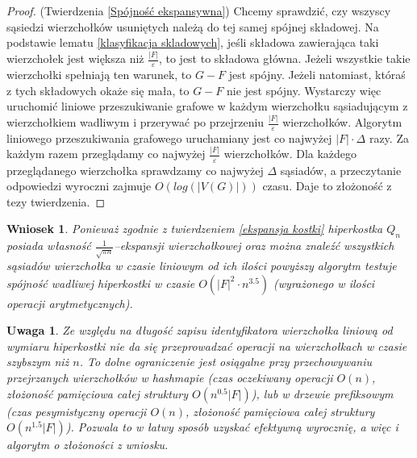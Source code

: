\documentclass{pracamgr}
\newtheorem{remark}[theorem]{Uwaga}
\newtheorem{corollary}[theorem]{Wniosek}
\begin{document}
   \begin{proof}
    (Twierdzenia \ref{Spójność ekspansywna})\newline
    Chcemy sprawdzić, czy wszyscy sąsiedzi wierzchołków usuniętych należą do tej samej spójnej składowej. Na podstawie lematu \ref{klasyfikacja skladowych},
    jeśli składowa zawierająca taki wierzchołek jest większa niż $\frac{|F|}{\varepsilon}$, to jest to składowa główna.
    Jeżeli wszystkie takie wierzchołki spełniają ten warunek, to $G-F$ jest spójny.
    Jeżeli natomiast, któraś z tych składowych okaże się mała, to $G-F$ nie jest spójny.\newline
    Wystarczy więc uruchomić liniowe przeszukiwanie grafowe w każdym wierzchołku sąsiadującym z wierzchołkiem wadliwym i przerywać po przejrzeniu
    $\frac{|F|}{\varepsilon}$ wierzchołków.\newline
    Algorytm liniowego przeszukiwania grafowego uruchamiany jest co najwyżej $|F|\cdot\Delta$ razy.
    Za każdym razem przeglądamy co najwyżej $\frac{|F|}{\varepsilon}$ wierzchołków.
    Dla każdego przeglądanego wierzchołka sprawdzamy co najwyżej $\Delta$ sąsiadów, a przeczytanie odpowiedzi wyroczni zajmuje $O(log(|V(G)|))$ czasu.
    Daje to złożoność z tezy twierdzenia.
   \end{proof}
   \begin{corollary}\label{ekspansywna spojnosc dla kostki}
    Ponieważ zgodnie z twierdzeniem \ref{ekspansja kostki} hiperkostka $Q_n$ posiada własność\newline
    $\frac{1}{\sqrt{\pi n}}$--ekspansji wierzchołkowej
    oraz można znaleźć wszystkich sąsiadów wierzchołka w czasie liniowym od ich ilości powyższy algorytm testuje spójność wadliwej hiperkostki w czasie
    ${O(|F|^2\cdot n^{3.5})}$ (wyrażonego w ilości operacji arytmetycznych).
   \end{corollary}
   \begin{remark}\label{prawdziwa zlozoność ekspansywnej}
    Ze względu na długość zapisu identyfikatora wierzchołka liniową od wymiaru hiperkostki nie da się przeprowadzać operacji na wierzchołkach w czasie szybszym niż
    $n$. To dolne ograniczenie jest osiągalne przy przechowywaniu przejrzanych wierzchołków w hashmapie
    (czas oczekiwany operacji $O(n)$, złożoność pamięciowa całej struktury $O(n^{0.5}|F|)$),
    lub w drzewie prefiksowym (czas pesymistyczny operacji $O(n)$, złożoność pamięciowa całej struktury $O(n^{1.5}|F|)$).
    Pozwala to w łatwy sposób uzyskać efektywną wyrocznię, a więc i algorytm o złożoności z wniosku.
   \end{remark}
\end{document}
